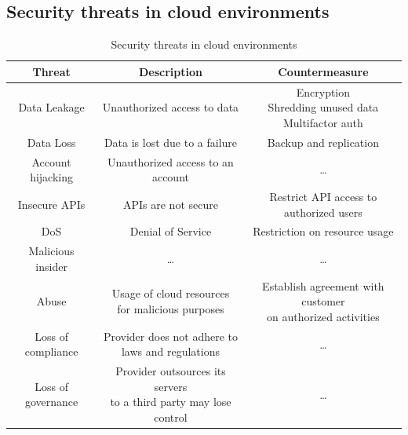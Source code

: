 \subsection{Security threats in cloud environments}
\begin{table}[htbp]
   \centering
   \begin{tabular}{|c|c|c|}
      \hline
      \textbf{Threat} & \textbf{Description} & \textbf{Countermeasure} \\
      \hline
      Data Leakage & Unauthorized access to data & \shortstack{
         Encryption\\
         Shredding unused data\\
         Multifactor auth
      } \\
      \hline
      Data Loss & Data is lost due to a failure & Backup and replication \\
      \hline
      Account hijacking & Unauthorized access to an account & \dots\\
      \hline
      Insecure APIs & APIs are not secure & \shortstack{Restrict API access to\\ authorized users}\\
      \hline
      DoS & Denial of Service & Restriction on resource usage\\
      \hline
      Malicious insider & \dots & \dots \\
      \hline
      Abuse & \shortstack{Usage of cloud resources\\ for malicious purposes} & \shortstack{Establish agreement with customer\\ on authorized activities} \\
      \hline
      Loss of compliance & \shortstack{Provider does not adhere to\\ laws and regulations} & \dots \\
      \hline
      Loss of governance & \shortstack{Provider outsources its servers \\to a third party may lose control} & \dots \\
      \hline
      
   \end{tabular}
   \caption{Security threats in cloud environments}
   \label{tab:securitythreats_cloud}
\end{table}

